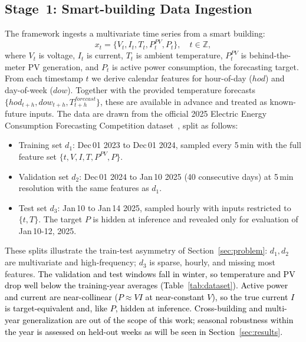 \documentclass[final,10pt,1p,authoryear]{elsarticle}
\theoremstyle{definition}
\begin{document}
\subsection{Stage~1: Smart-building Data Ingestion}\label{datasets}
The framework ingests a multivariate time series from a smart building:
\begin{equation}
{x}_t=\{V_t, I_t, T_t, P^{{PV}}_t, P_t\}, \quad t\in\mathbb{Z},
\end{equation}
where $V_t$ is voltage, $I_t$ is current, $T_t$ is ambient temperature, $P^{{PV}}_t$ is behind-the-meter PV generation, and $P_t$ is active power consumption, the forecasting target. From each timestamp $t$ we derive calendar features for hour-of-day ($hod$) and day-of-week ($dow$). Together with the provided temperature forecasts $\{hod_{t+h},dow_{t+h},T^{{forecast}}_{t+h}\}$, these are available in advance and treated as known-future inputs. The data are drawn from the official 2025 Electric Energy Consumption Forecasting Competition dataset~\citet{gomes_2024_14275645}, split as follows:
\begin{itemize}[leftmargin=1em]
\item Training set $d_1$: Dec\,01 2023 to Dec\,01 2024, sampled every 5\,min with the full feature set $\{t,V,I,T,P^{{PV}},P\}$.
\item Validation set $d_2$: Dec\,01 2024 to Jan\,10 2025 (40 consecutive days) at 5\,min resolution with the same features as $d_1$.
\item Test set $d_3$: Jan\,10 to Jan\,14 2025, sampled hourly with inputs restricted to $\{t,T\}$. The target $P$ is hidden at inference and revealed only for evaluation of Jan\,10-12, 2025.
\end{itemize}
These splits illustrate the train-test asymmetry of Section~\ref{sec:problem}: $d_1,d_2$ are multivariate and high-frequency; $d_3$ is sparse, hourly, and missing most features. \textcolor{black}{The validation and test windows fall in winter, so temperature and PV drop well below the training-year averages (Table~\ref{tab:dataset}). Active power and current are near-collinear ($P\approx VI$ at near-constant $V$), so the true current $I$ is target-equivalent and, like $P$, hidden at inference. Cross-building and multi-year generalization are out of the scope of this work; seasonal robustness within the year is assessed on held-out weeks as will be seen in Section~\ref{sec:results}.}
\end{document}
